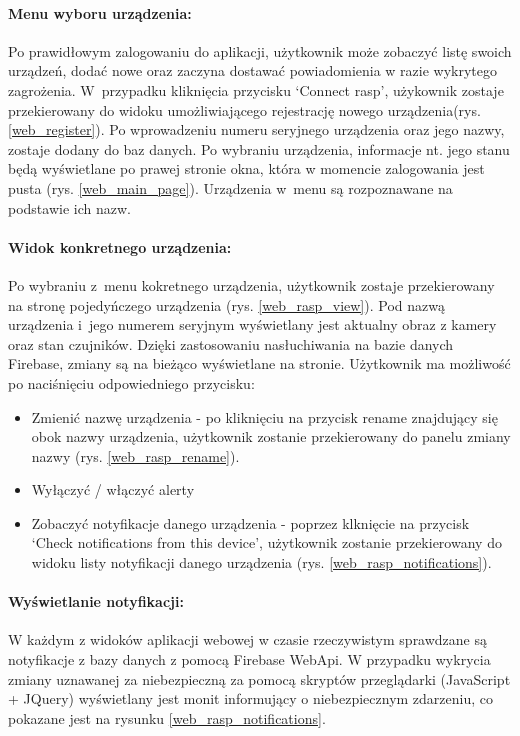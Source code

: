 \paragraph{Menu wyboru urządzenia:} Po prawidłowym zalogowaniu do aplikacji, użytkownik może zobaczyć listę swoich urządzeń, dodać nowe oraz zaczyna dostawać powiadomienia w razie wykrytego zagrożenia. W~przypadku kliknięcia przycisku `Connect rasp', użykownik zostaje przekierowany do widoku umożliwiającego rejestrację nowego urządzenia(rys. \ref{web_register}). Po wprowadzeniu numeru seryjnego urządzenia oraz jego nazwy, zostaje dodany do baz danych. Po wybraniu urządzenia, informacje nt. jego stanu będą wyświetlane po prawej stronie okna, która w momencie zalogowania jest pusta (rys. \ref{web_main_page}). Urządzenia w~menu są rozpoznawane na podstawie ich nazw. 

\paragraph{Widok konkretnego urządzenia:} Po wybraniu z~menu kokretnego urządzenia, użytkownik zostaje przekierowany na stronę pojedyńczego urządzenia (rys. \ref{web_rasp_view}). Pod nazwą urządzenia i~jego numerem seryjnym wyświetlany jest aktualny obraz z kamery oraz stan czujników. Dzięki zastosowaniu nasłuchiwania na bazie danych Firebase, zmiany są na bieżąco wyświetlane na stronie. Użytkownik ma możliwość po naciśnięciu odpowiedniego przycisku:
\begin{itemize}
\item Zmienić nazwę urządzenia - po kliknięciu na przycisk rename znajdujący się obok nazwy urządzenia, użytkownik zostanie przekierowany do panelu zmiany nazwy (rys. \ref{web_rasp_rename}).
\item Wyłączyć / włączyć alerty 
\item Zobaczyć notyfikacje danego urządzenia - poprzez klknięcie na przycisk `Check notifications from this device', użytkownik zostanie przekierowany do widoku listy notyfikacji danego urządzenia (rys. \ref{web_rasp_notifications}).
\end{itemize}

\paragraph{Wyświetlanie notyfikacji:} W każdym z widoków aplikacji webowej w czasie rzeczywistym sprawdzane są notyfikacje z bazy danych z pomocą Firebase WebApi. W przypadku wykrycia zmiany uznawanej za niebezpieczną za pomocą skryptów przeglądarki (JavaScript + JQuery) wyświetlany jest monit informujący o niebezpiecznym zdarzeniu, co pokazane jest na rysunku \ref{web_rasp_notifications}.  

